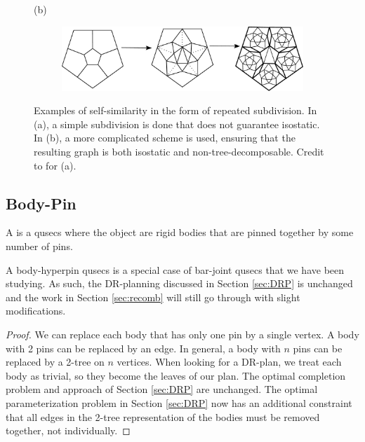 \begin{figure}
    (b)
    \begin{subfigure}{0.8\linewidth}
        \includegraphics[width=\linewidth]{img/pentawesome}
    \end{subfigure}
    \caption{Examples of self-similarity in the form of repeated subdivision. In (a), a simple subdivision is done that does not guarantee isostatic. In (b), a more complicated scheme is used, ensuring that the resulting graph is both isostatic and non-tree-decomposable. Credit to \cite{subdivision_paper} for (a).}
    \label{fig:subdivision}
\end{figure}

\subsection{Body-Pin}


\begin{definition}
    A  is a qusecs where the object are rigid bodies that are pinned together by some number of pins.
\end{definition}

\begin{remark}
    A body-hyperpin qusecs is a special case of bar-joint qusecs that we have been studying. As such, the DR-planning discussed in Section \ref{sec:DRP} is unchanged and the work in Section \ref{sec:recomb} will still go through with slight modifications.
\end{remark}

\begin{proof}
    We can replace each body that has only one pin by a single vertex. A body with 2 pins can be replaced by an edge. In general, a body with $n$ pins can be replaced by a 2-tree on $n$ vertices. When looking for a DR-plan, we treat each body as trivial, so they become the leaves of our plan. The optimal completion problem and approach of Section \ref{sec:DRP} are unchanged. The optimal parameterization problem in Section \ref{sec:DRP} now has an additional constraint that all edges in the 2-tree representation of the bodies must be removed together, not individually.
\end{proof}

